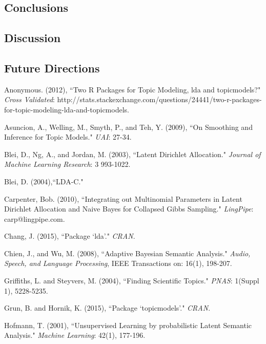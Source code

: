 \documentclass[12pt]{report}
\begin{document}
\begin{flushleft}
\section{Conclusions}
\subsection{Discussion}

\subsection{Future Directions}

\end{flushleft}




\begin{thebibliography}{4}
	Anonymous. (2012),
	``Two R Packages for Topic Modeling, lda and topicmodels?" \textit{Cross Validated}: http://stats.stackexchange.com/questions/24441/two-r-packages-for-topic-modeling-lda-and-topicmodels.
	
	Asuncion, A., Welling, M., Smyth, P., and Teh, Y.  (2009),
	``On Smoothing and Inference for Topic Models." 
	\textit{UAI}: 27-34.
	
	Blei, D., Ng, A., and Jordan, M.  (2003),
	``Latent Dirichlet Allocation."
	\textit{Journal of Machine Learning Research}: 3 993-1022.
	
	Blei, D. (2004),``LDA-C."
	
	Carpenter, Bob. (2010),
	``Integrating out Multinomial Parameters in Latent Dirichlet Allocation and Naive Bayes for Collapsed Gibbs Sampling."
	\textit{LingPipe}: carp@lingpipe.com.
	
	Chang, J.  (2015),
	``Package `lda'."
	\textit{CRAN}.
	
	Chien, J., and Wu, M.  (2008),
	``Adaptive Bayesian Semantic Analysis."
	\textit{Audio, Speech, and Language Processing}, IEEE Transactions on: 16(1), 198-207.
	
	Griffiths, L. and Steyvers, M.  (2004),
	``Finding Scientific Topics."
	\textit{PNAS}: 1(Suppl 1), 5228-5235.
	
	Grun, B. and Hornik, K.  (2015),
	``Package `topicmodels'."
	\textit{CRAN}.
	
	Hofmann, T.  (2001),
	``Unsupervised Learning by probabilistic Latent Semantic Analysis."
	\textit{Machine Learning}: 42(1), 177-196.
	

\end{thebibliography}
\end{document}

